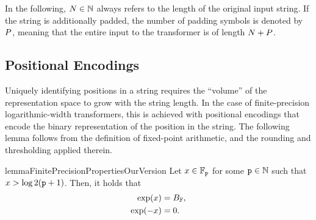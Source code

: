 In the following, ${{N}} \in {{\mathbb{N}}}$ always refers to the length of the original input string. 
If the string is additionally padded, the number of padding symbols is denoted by ${P}$, meaning that the entire input to the transformer is of length ${{N}} + {P}$.

\subsection{Positional Encodings} \label{app:positional-encodings}
Uniquely identifying positions in a string requires the ``volume'' of the representation space to grow with the string length.
In the case of finite-precision logarithmic-width transformers, this is achieved with positional encodings that encode the binary representation of the position in the string.
The following lemma follows from the definition of fixed-point arithmetic, and the rounding and thresholding applied therein.
\begin{restatable}{lemma}{FinitePrecisionPropertiesOurVersion} \label{lem:our-finite-precision-properties}
   Let $x \in {{\mathbb{F}}}_{{\texttt{p}}}$ for some ${{\texttt{p}}} \in {{\mathbb{N}}}$ such that $x > \log{2} ({{\texttt{p}}} + 1)$.
   Then, it holds that
   \begin{subequations}
      \begin{align}
         \exp(x) &= {{B_{{{\mathbb{F}}}}}}, \\
         \exp(-x) &= 0.
      \end{align}
   \end{subequations}
\end{restatable}

